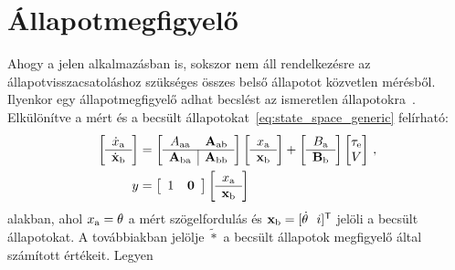 \chapter{Állapotmegfigyelő}\label{chap:observer}
Ahogy a jelen alkalmazásban is, sokszor nem áll rendelkezésre az állapotvisszacsatoláshoz szükséges 
összes belső állapotot közvetlen mérésből. Ilyenkor egy állapotmegfigyelő adhat becslést az ismeretlen 
állapotokra~\cite{kalman1960new,OgataModernControl}. Elkülönítve a mért és a becsült állapotokat~\eqref{eq:state_space_generic} 
felírható:
\begin{equation}\label{eq:observer_state}
    \begin{split}
    \left[\begin{array}{c}
        \dot x_{\mathrm{a}} \\ \hline
        \dot{\mathbf{x}}_{\mathrm{b}}
    \end{array}\right]
    &=
    \left[\begin{array}{c|c}
        A_{\mathrm{aa}} & \mathbf{A}_{\mathrm{a b}} \\ \hline
        \mathbf{A}_{\mathrm{ba}} & \mathbf{A}_{\mathrm{bb}}
    \end{array}\right]
    \left[\begin{array}{c}
        x_{\mathrm{a}} \\ \hline
        \mathbf{x}_{\mathrm{b}}
    \end{array}\right]
    +
    \left[\begin{array}{c}
        B_{\mathrm{a}} \\ \hline
        \mathbf{B}_{\mathrm{b}}
    \end{array}\right]
    \begin{bmatrix}
        \tau_{\mathrm{e}} \\
        V \\
    \end{bmatrix}\,,\\
    y &= 
    \left[\begin{array}{c|c}
        1 & \mathbf{0}
    \end{array}\right]
    \left[\begin{array}{c}
        x_{\mathrm{a}} \\ \hline
        \mathbf{x}_{\mathrm{b}}
    \end{array}\right]
    \end{split}
\end{equation}
alakban, ahol $x_{\mathrm{a}} = \theta$ a mért szögelfordulás és 
$\mathbf{x}_{\mathrm{b}} = [\dot \theta~~i]^{\mathsf T}$ jelöli a becsült állapotokat.
A továbbiakban jelölje $\tilde{*}$ a becsült állapotok megfigyelő által számított értékeit. Legyen

